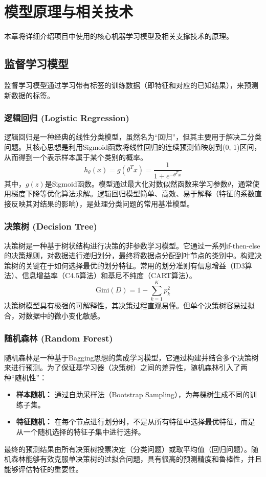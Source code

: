 \documentclass{SYSUReport}
\begin{document}
\section{模型原理与相关技术}
本章将详细介绍项目中使用的核心机器学习模型及相关支撑技术的原理。

\subsection{监督学习模型}
监督学习模型通过学习带有标签的训练数据（即特征和对应的已知结果），来预测新数据的标签。

\subsubsection{逻辑回归 (Logistic Regression)}
逻辑回归是一种经典的线性分类模型，虽然名为“回归”，但其主要用于解决二分类问题。其核心思想是利用Sigmoid函数将线性回归的连续预测值映射到(0, 1)区间，从而得到一个表示样本属于某个类别的概率。
\begin{equation}
    h_\theta(x) = g(\theta^T x) = \frac{1}{1 + e^{-\theta^T x}}
\end{equation}
其中，$g(z)$是Sigmoid函数。模型通过最大化对数似然函数来学习参数$\theta$，通常使用梯度下降等优化算法求解。逻辑回归模型简单、高效、易于解释（特征的系数直接反映其对结果的影响），是处理分类问题的常用基准模型。

\subsubsection{决策树 (Decision Tree)}
决策树是一种基于树状结构进行决策的非参数学习模型。它通过一系列if-then-else的决策规则，对数据进行递归划分，最终将数据点分配到叶节点的类别中。构建决策树的关键在于如何选择最优的划分特征。常用的划分准则有信息增益（ID3算法）、信息增益率（C4.5算法）和基尼不纯度（CART算法）。
\begin{equation}
    \text{Gini}(D) = 1 - \sum_{k=1}^{K} p_k^2
\end{equation}
决策树模型具有极强的可解释性，其决策过程直观易懂。但单个决策树容易过拟合，对数据中的微小变化敏感。

\subsubsection{随机森林 (Random Forest)}
随机森林是一种基于Bagging思想的集成学习模型，它通过构建并结合多个决策树来进行预测。为了保证基学习器（决策树）之间的差异性，随机森林引入了两种“随机性”：
\begin{itemize}
    \item \textbf{样本随机：} 通过自助采样法（Bootstrap Sampling），为每棵树生成不同的训练子集。
    \item \textbf{特征随机：} 在每个节点进行划分时，不是从所有特征中选择最优特征，而是从一个随机选择的特征子集中进行选择。
\end{itemize}
最终的预测结果由所有决策树投票决定（分类问题）或取平均值（回归问题）。随机森林能够有效克服单决策树的过拟合问题，具有很高的预测精度和鲁棒性，并且能够评估特征的重要性。
\end{document}
